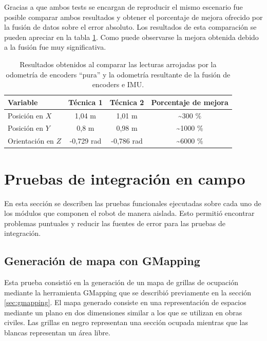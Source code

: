 Gracias a que ambos tests se encargan de reproducir el mismo escenario fue posible comparar ambos resultados y obtener el porcentaje de mejora ofrecido por la fusión de datos sobre el error absoluto. Los resultados de esta comparación se pueden apreciar en la tabla \ref{tab:comparacionOdom}. Como puede observarse la mejora obtenida debido a la fusión fue muy significativa.

\begin{table}[!htbp]
    \centering
    \centering
    \caption[Comparacion de calculos de odometría]{Resultados obtenidos al comparar las lecturas arrojadas por la odometría de encoders ``pura'' y la odometría resultante de la fusión de encoders e IMU.}
    \begin{tabular}{lccc}
        \toprule
        \textbf{Variable}  & \textbf{Técnica 1} & \textbf{Técnica 2} & \textbf{Porcentaje de mejora} \\
        \midrule
        Posición en $X$    & 1,04 m             & 1,01 m             & \textasciitilde300 \%         \\
        Posición en $Y$    & 0,8 m              & 0,98 m             & \textasciitilde1000 \%        \\
        Orientación en $Z$ & -0,729 rad         & -0,786 rad         & \textasciitilde6000 \%        \\
        \bottomrule
    \end{tabular}
    \label{tab:comparacionOdom}
\end{table}


\section{Pruebas de integración en campo}

En esta sección se describen las pruebas funcionales ejecutadas sobre cada uno de los módulos que componen el robot de manera aislada. Esto permitió encontrar problemas puntuales y reducir las fuentes de error para las pruebas de integración.

\subsection{Generación de mapa con GMapping}

Esta prueba consistió en la generación de un mapa de grillas de ocupación mediante la herramienta GMapping que se describió previamente en la sección \ref{sec:gmapping}. El mapa generado consiste en una representación de espacios mediante un plano en dos dimensiones similar a los que se utilizan en obras civiles. Las grillas en negro representan una sección ocupada mientras que las blancas representan un área libre.

